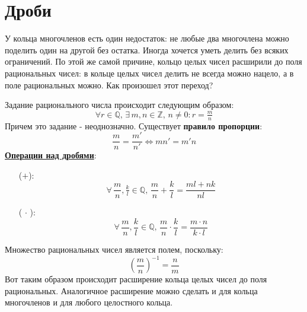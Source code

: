 \documentclass[12pt]{article}
\newcommand{\MQ}{\mathbb{Q}}
\newcommand{\MZ}{\mathbb{Z}}
\theoremstyle{definition}
\begin{document}
\section*{Дроби}

У кольца многочленов есть один недостаток: не любые два многочлена можно поделить один на другой без остатка.
Иногда хочется уметь делить без всяких ограничений. По этой же самой причине, кольцо целых чисел расширили до поля рациональных чисел: в кольце целых чисел делить не всегда можно нацело, а в поле рациональных можно. Как произошел этот переход?

Задание рационального числа происходит следующим образом:
$$
	\forall r \in \MQ, \, \exists \, m,n \in \MZ, \, n \neq 0 \colon r = \tfrac{m}{n}
$$
Причем это задание - неоднозначно. Существует \textbf{правило пропорции}:
$$
	\dfrac{m}{n} = \dfrac{m'}{n'} \Leftrightarrow mn' = m'n
$$
\textbf{\uline{Операции над дробями}}:
\begin{enumerate}
	\item[($+$):] 
	$$
		\forall  \,\dfrac{m}{n}, \tfrac{k}{l} \in \MQ, \, \dfrac{m}{n} + \dfrac{k}{l} = \dfrac{ml + nk}{nl}
	$$
	\item[($\, \cdot\, $):] 
	$$
		\forall  \,\dfrac{m}{n}, \dfrac{k}{l} \in \MQ, \, \dfrac{m}{n}{\cdot}\dfrac{k}{l} = \dfrac{m{\cdot}n}{k{\cdot}l}
	$$
\end{enumerate}
Множество рациональных чисел является полем, поскольку:
$$
	\left(\dfrac{m}{n}\right)^{-1} = \dfrac{n}{m}
$$
Вот таким образом происходит расширение кольца целых чисел до поля рациональных. Аналогичное расширение можно сделать и для кольца многочленов и для любого целостного кольца.
\end{document}

